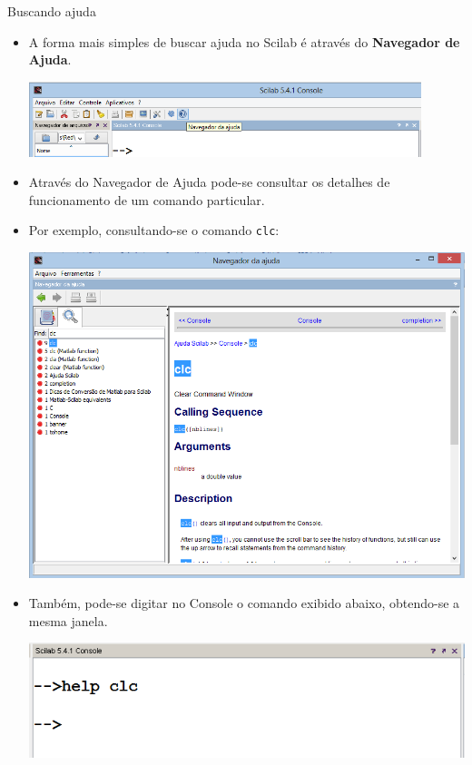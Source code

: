 \begin{frame}{Buscando ajuda}
  \begin{itemize}
    \item A forma mais simples de buscar ajuda no Scilab é através do
    \textbf{Navegador de Ajuda}.
    \begin{center}
      \includegraphics[width=0.9\textwidth]{images/ajuda1.png}
    \end{center}
    \item Através do Navegador de Ajuda pode-se \alert{consultar} os
    detalhes de funcionamento de um comando particular.
    \item Por exemplo, consultando-se o comando \texttt{clc}:
    \begin{center}
      \includegraphics[scale=0.4]{images/ajuda2.png}
    \end{center}
    \item Também, pode-se digitar no Console o comando exibido abaixo,
    obtendo-se a mesma janela.
    \begin{center}
      \includegraphics[scale=0.4]{images/ajuda3.png}
    \end{center}
  \end{itemize}
\end{frame}

